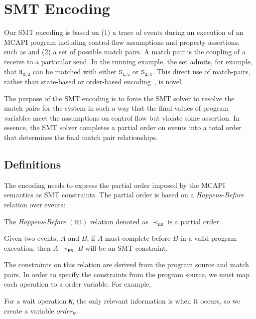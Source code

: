 \section{SMT Encoding}\label{sec:smt}

Our SMT encoding is based on (1) a trace of events during an execution
of an MCAPI program including control-flow assumptions and property
assertions, such as  and (2) a set of possible
match pairs. A match pair is the coupling of a receive to a particular
send.  In the running example, the set admits, for example, that
$\mathtt{R_{0,2}}$ can be matched with either $\mathtt{S_{1,5}}$ or
$\mathtt{S_{2,4}}$. This direct use of match-pairs, rather than state-based or order-based
encoding~\cite{elwakil:padtad10,elwakil:atva10}, is novel.

The purpose of the SMT encoding is to force the SMT solver to resolve
the match pairs for the system in such a way that the final values of
program variables meet the assumptions on control flow but violate
some assertion. In essence, the SMT solver completes a partial order
on events into a total order that determines the final match pair
relationships.

\subsection{Definitions} \label{sec:smt-defns}

The encoding needs to express the partial order imposed by the MCAPI
semantics as SMT constraints. The partial order is based on a
\emph{Happens-Before} relation over events:

\begin{definition}
The \emph{Happens-Before} $(\mathtt{HB})$ relation denoted as
$\mathrm{\prec_\mathtt{HB}}$ is a partial order.
\label{def:hb}
\end{definition}

Given two events, $A$ and $B$, if $A$ must complete before $B$ in a
valid program execution, then $A$ $\mathrm{\prec_{\mathtt{HB}}}$ $B$
will be an SMT constraint.

The constraints on this relation are derived from the program source
and match pairs. In order to specify the constraints from the program
source, we must map each operation to a order variable. For example,

\begin{definition}[Wait] \label{def:event}
For a wait operation \texttt{W}, the only relevant information is when
it occurs, so we create a variable $\mathit{order}_\mathtt{W}$.
\end{definition}


